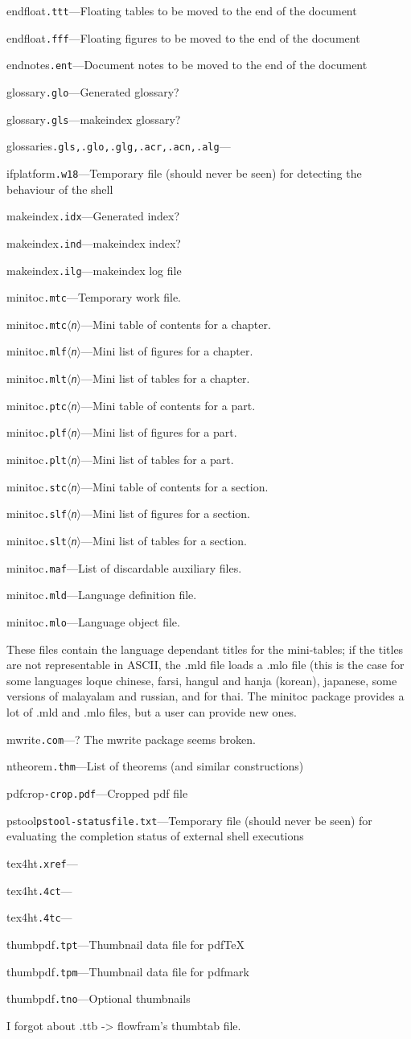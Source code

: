 \documentclass{article}
\newcommand\ext[1]{\texttt{#1}}
\newcommand\EXT[3]{\noindent #1\quad\ext{#2}\quad---\quad#3\par}
\def\<#1>{$\langle$\textit{\rmfamily n}$\rangle$}
\begin{document}
\EXT{endfloat}{.ttt}{Floating tables to be moved to the end of the document}
\EXT{endfloat}{.fff}{Floating figures to be moved to the end of the document}
\EXT{endnotes}{.ent}{Document notes to be moved to the end of the document}

\EXT{glossary}{.glo}{Generated glossary?}
\EXT{glossary}{.gls}{makeindex glossary?}
\EXT{glossaries}{.gls,.glo,.glg,.acr,.acn,.alg}{}

\EXT{ifplatform}{.w18}{Temporary file (should never be seen) for detecting the behaviour of the shell}

\EXT{makeindex}{.idx}{Generated index?}
\EXT{makeindex}{.ind}{makeindex index?}
\EXT{makeindex}{.ilg}{makeindex log file}

\EXT{minitoc}{.mtc}{Temporary work file.}
\EXT{minitoc}{.mtc\<n>}{Mini table of contents for a chapter.}
\EXT{minitoc}{.mlf\<n>}{Mini list of figures for a chapter.}
\EXT{minitoc}{.mlt\<n>}{Mini list of tables for a chapter.}
\EXT{minitoc}{.ptc\<n>}{Mini table of contents for a part.}
\EXT{minitoc}{.plf\<n>}{Mini list of figures for a part.}
\EXT{minitoc}{.plt\<n>}{Mini list of tables for a part.}
\EXT{minitoc}{.stc\<n>}{Mini table of contents for a section.}
\EXT{minitoc}{.slf\<n>}{Mini list of figures for a section.}
\EXT{minitoc}{.slt\<n>}{Mini list of tables for a section.}
\EXT{minitoc}{.maf}{List of discardable auxiliary files.}
\EXT{minitoc}{.mld}{Language definition file.}
\EXT{minitoc}{.mlo}{Language object file.}

These files contain the language dependant titles for the
mini-tables; if the titles are not representable in ASCII,
the .mld file loads a .mlo file (this is the case for some
languages loque chinese, farsi, hangul and hanja (korean),
japanese, some versions of malayalam and russian, and for
thai. The minitoc package provides a lot of .mld and .mlo
files, but a user can provide new ones.

\EXT{mwrite}{.com}{? The mwrite package seems broken.}
\EXT{ntheorem}{.thm}{List of theorems (and similar constructions)}

\EXT{pdfcrop}{-crop.pdf}{Cropped pdf file}

\EXT{pstool}{pstool-statusfile.txt}{Temporary file (should never be seen) for evaluating the completion status of external shell executions}

\EXT{tex4ht}{.xref}{}
\EXT{tex4ht}{.4ct}{}
\EXT{tex4ht}{.4tc}{}

\EXT{thumbpdf}{.tpt}{Thumbnail data file for pdfTeX}
\EXT{thumbpdf}{.tpm}{Thumbnail data file for pdfmark}
\EXT{thumbpdf}{.tno}{Optional thumbnails}
I forgot about \jobname.ttb -> flowfram's thumbtab file.
\end{document}
